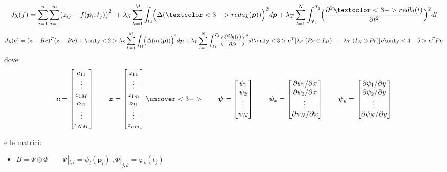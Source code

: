 \documentclass[landscape,9pt]{beamer}                           %
\begin{document}
\begin{frame}
{
\begin{multline*}
J_{\bm \lambda }(f)=\sum_{i=1}^n \sum_{j=1}^m \bigl( z_{ij} - f(\bm p_i,t_j) \bigr)^2 \ +\lambda_S  \sum_{k=1}^M \int_{\Omega} \Bigl( \Delta(  \textcolor<3->{red}{a_k(\bm p)}  ) \Bigr)^2 d \bm p + \lambda_T \sum_{l=1}^N\int_{T_1}^{T_2} \Bigl( \frac{\partial^2  \textcolor<3->{red}{b_l(t)}   }{\partial t ^2} \Bigr)^2 dt 
\end{multline*}
}
{
$$
J_{\bm \lambda }(\bm c) = (\bm z - B \bm c)^T (\bm z - B \bm c) + \only<2>{\lambda_S  \sum_{k=1}^M \int_{\Omega} \Bigl( \Delta(  a_k(\bm p)  ) \Bigr)^2 d \bm p + \lambda_T \sum_{l=1}^N\int_{T_1}^{T_2} \Bigl( \frac{\partial^2  b_l(t)   }{\partial t ^2} \Bigr)^2 dt} \only<3>{\bm c^T [\lambda_S\    (P_S \otimes I_M)   \ +\  \lambda_T\   (I_N \otimes P_T)]\bm c} \only<4-5>{\bm c^T P\bm c}
$$
}
{
dove:
$$
\bm{c} =
\begin{bmatrix}
c_{11}  \\
\vdots\\
c_{1M}  \\
c_{21}  \\
\vdots\\
c_{NM}
\end{bmatrix}
\qquad
\bm z =
\begin{bmatrix}
z_{11}  \\
\vdots\\
z_{1m}  \\
z_{21}  \\
\vdots\\
z_{nm}
\end{bmatrix}
\uncover<3->
{
\qquad
\bm \psi =
\begin{bmatrix}
\psi_{1}  \\
\psi_{2}  \\
\vdots\\
\psi_{N}
\end{bmatrix}
\qquad
\bm \psi_x=  \begin{bmatrix}
\partial \psi_{1}/\partial x \\
\partial \psi_{2}/\partial x  \\
\vdots\\
\partial \psi_{N}/\partial x \end{bmatrix} 
\qquad
\bm \psi_y=  \begin{bmatrix}
\partial \psi_{1}/\partial y  \\
\partial \psi_{2}/\partial y  \\
\vdots\\
\partial \psi_{N}/\partial y\end{bmatrix}
}
$$
}
\par\bigskip
{}
{
e le matrici: 
\begin{itemize}
\item $B = \Psi \otimes \Phi \qquad \Psi|_{i,l}=\psi_{l}(\bm p_i) \ , \Phi|_{j,k}=\varphi_{k}( t_j)$


\end{itemize}}
\end{frame}
\end{document}
